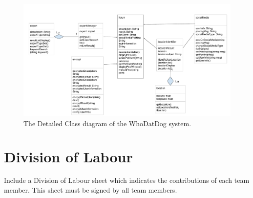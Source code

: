 \documentclass[]{article}
\begin{document}
\begin{figure}[H]
	\centering
	\includegraphics[width=\textwidth]{SE 3A04 D3 detailed class diagram.pdf}
	\caption{\label{fig:analysisclassdiagram}The Detailed Class diagram of the WhoDatDog system.}
\end{figure}

\appendix
\section{Division of Labour}
\label{sec:division_of_labour}
Include a Division of Labour sheet which indicates the contributions of each team member. This sheet must be signed by all team members.

\newpage
\end{document}
